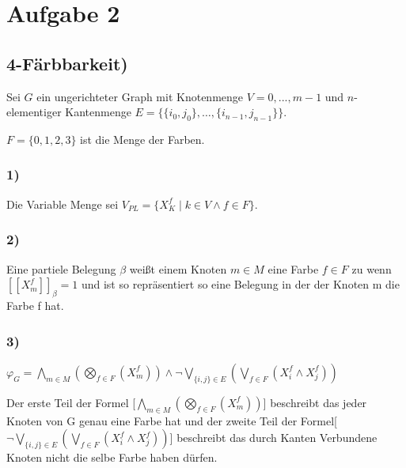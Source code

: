 \section*{Aufgabe 2}

\subsection*{4-Färbbarkeit)}

Sei $G$ ein ungerichteter Graph mit Knotenmenge $V = {0,...,m-1}$ und $n$-elementiger Kantenmenge $E = \lbrace \lbrace i_0,j_0\rbrace, \ldots , \lbrace i_{n-1} , j_{n-1} \rbrace \rbrace$.

$F = \lbrace 0,1,2,3 \rbrace$ ist die Menge der Farben.

\subsubsection*{1)}

Die Variable Menge sei $V_{PL}  = \lbrace X_K^f \mid k \in V \wedge f \in F \rbrace$.

\subsubsection*{2)}

Eine partiele Belegung $\beta$ weißt einem Knoten $m \in M$ eine Farbe $f \in F$ zu wenn $[\![X_m^f]\!]_\beta = 1$ und ist so repräsentiert so eine Belegung in der der Knoten m die Farbe f hat.

\subsubsection*{3)}

$\varphi_G = \bigwedge\limits_{m \in M} (\bigotimes\limits_{f \in F} (X_m^f) )
\wedge
\neg \bigvee\limits_{\lbrace i,j \rbrace \in E}(\bigvee\limits_{ f \in F} (X_i^f \wedge X_j^f))$

Der erste Teil der Formel [$\bigwedge\limits_{m \in M} (\bigotimes\limits_{f \in F} (X_m^f) )$] beschreibt das jeder Knoten von G genau eine Farbe hat und der zweite Teil der Formel[$\neg \bigvee\limits_{\lbrace i,j \rbrace \in E}(\bigvee\limits_{ f \in F} (X_i^f \wedge X_j^f))$] beschreibt das durch Kanten Verbundene Knoten nicht die selbe Farbe haben dürfen.


